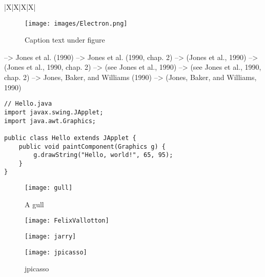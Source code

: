 \begin{table}[h]
\begin{tabu}{|X|X|X|X|}
\begin{figure}[!htb] %
\centering %
\texttt{[image: images/Electron.png]}
\caption[Text for Table of Contents]{Caption text under figure}
\label{fig:Electron}
\end{figure}

\citet{jon90}	               -->    	Jones et al. (1990)
\citet[chap. 2]{jon90}	     -->    	Jones et al. (1990, chap. 2)
\citep{jon90}	               -->    	(Jones et al., 1990)
\citep[chap. 2]{jon90}	     -->    	(Jones et al., 1990, chap. 2)
\citep[see][]{jon90}	       -->    	(see Jones et al., 1990)
\citep[see][chap. 2]{jon90}	 -->    	(see Jones et al., 1990, chap. 2)
\citet*{jon90}	             -->    	Jones, Baker, and Williams (1990)
\citep*{jon90}	             -->    	(Jones, Baker, and Williams, 1990)




\begin{lstlisting}
// Hello.java
import javax.swing.JApplet;
import java.awt.Graphics;

public class Hello extends JApplet {
    public void paintComponent(Graphics g) {
        g.drawString("Hello, world!", 65, 95);
    }
}
\end{lstlisting}

\begin{wrapfigure}{r}{0.5\textwidth}
  \begin{center}
    \texttt{[image: gull]}
  \end{center}
  \caption{A gull}
\end{wrapfigure}

\begin{figure}
\centering
\begin{minipage}{.275\linewidth}
  \texttt{[image: FelixVallotton]}
  \caption[figure1]{FelixVallotton}
  \label{img1}
\end{minipage}
\hspace{.05\linewidth}
\begin{minipage}{.275\linewidth}
  \texttt{[image: jarry]}
  \caption[figure2]{jarry}
  \label{img2}
\end{minipage}
\hspace{.05\linewidth}
\begin{minipage}{.275\linewidth}
  \texttt{[image: jpicasso]}
  \caption[figure3]{jpicasso}
  \label{img3}
\end{minipage}
\end{figure}



\end{tabu}
\end{table}
